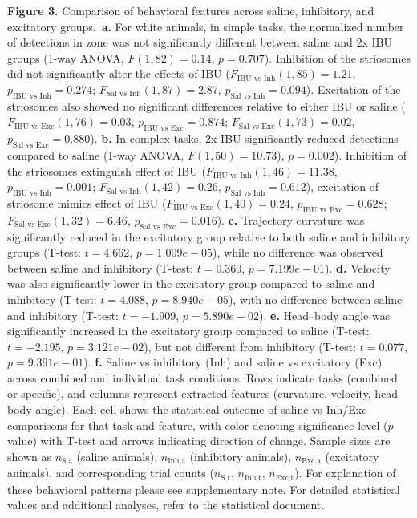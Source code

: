 \textbf{Figure 3.} Comparison of behavioral features across saline, inhibitory, and excitatory groups.\
\textbf{a.} For white animals, in simple tasks, the normalized number of detections in zone was not significantly different between saline and 2x IBU groups (1-way ANOVA, $F(1,82)=0.14$, $p=0.707$). Inhibition of the striosomes did not significantly alter the effects of IBU ($F_{\text{IBU vs Inh}}(1,85)=1.21$, $p_{\text{IBU vs Inh}}=0.274$; $F_{\text{Sal vs Inh}}(1,87)=2.87$, $p_{\text{Sal vs Inh}}=0.094$). Excitation of the striosomes also showed no significant differences relative to either IBU or saline ($F_{\text{IBU vs Exc}}(1,76)=0.03$, $p_{\text{IBU vs Exc}}=0.874$; $F_{\text{Sal vs Exc}}(1,73)=0.02$, $p_{\text{Sal vs Exc}}=0.880$). 
\textbf{b.} In complex tasks, 2x IBU significantly reduced detections compared to saline (1-way ANOVA, $F(1,50)=10.73$), $p=0.002$). Inhibition of the striosomes extinguish effect of IBU ($F_{\text{IBU vs Inh}}(1,46)=11.38$, $p_{\text{IBU vs Inh}}=0.001$; $F_{\text{Sal vs Inh}}(1,42)=0.26$, $p_{\text{Sal vs Inh}}=0.612$), excitation of striosome mimics effect of IBU ($F_{\text{IBU vs Exc}}(1,40)=0.24$, $p_{\text{IBU vs Exc}}=0.628$; $F_{\text{Sal vs Exc}}(1,32)=6.46$, $p_{\text{Sal vs Exc}}=0.016$).
\textbf{c.} Trajectory curvature was significantly reduced in the excitatory group relative to both saline and inhibitory groups (T-test: $t=4.662$, $p=1.009e-05$), while no difference was observed between saline and inhibitory (T-test: $t=0.360$, $p=7.199e-01$).
\textbf{d.} Velocity was also significantly lower in the excitatory group compared to saline and inhibitory (T-test: $t=4.088$, $p=8.940e-05$), with no difference between saline and inhibitory (T-test: $t=-1.909$, $p=5.890e-02$).
\textbf{e.} Head–body angle was significantly increased in the excitatory group compared to saline (T-test: $t=-2.195$, $p=3.121e-02$), but not different from inhibitory (T-test: $t=0.077$, $p=9.391e-01$).
\textbf{f.} Saline vs inhibitory (Inh) and saline vs excitatory (Exc) across combined and individual task conditions. Rows indicate tasks (combined or specific), and columns represent extracted features (curvature, velocity, head–body angle). Each cell shows the statistical outcome of saline vs Inh/Exc comparisons for that task and feature, with color denoting significance level ($p$ value) with T-test and arrows indicating direction of change. Sample sizes are shown as $n_{\text{S,a}}$ (saline animals), $n_{\text{Inh,a}}$ (inhibitory animals), $n_{\text{Exc,a}}$ (excitatory animals), and corresponding trial counts ($n_{\text{S,t}}$, $n_{\text{Inh,t}}$, $n_{\text{Exc,t}}$). For explanation of these behavioral patterns please see supplementary note.
For detailed statistical values and additional analyses, refer to the statistical document.


